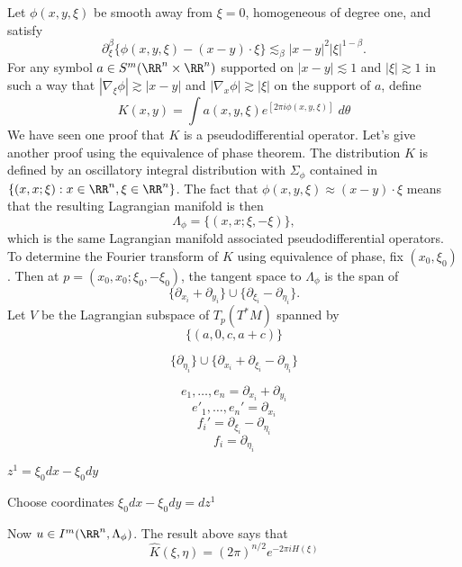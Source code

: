 \begin{example}
    Let $\phi(x,y,\xi)$ be smooth away from $\xi = 0$, homogeneous of degree one, and satisfy
    \[ \partial^\beta_\xi \{ \phi (x,y,\xi) - (x - y) \cdot \xi \} \lesssim_\beta |x - y|^2 |\xi|^{1-\beta}. \]
    For any symbol $a \in S^m(\RR^n \times \RR^n)$ supported on $|x - y| \lesssim 1$ and $|\xi| \gtrsim 1$ in such a way that $|\nabla_\xi \phi| \gtrsim |x - y|$ and $|\nabla_x \phi | \gtrsim |\xi|$ on the support of $a$, define
    \[ K(x,y) = \int a(x,y,\xi) e^[2 \pi i \phi(x,y,\xi)]\; d\theta \]
    We have seen one proof that $K$ is a pseudodifferential operator. Let's give another proof using the equivalence of phase theorem. The distribution $K$ is defined by an oscillatory integral distribution with $\Sigma_\phi$ contained in $\{ (x,x;\xi) : x \in \RR^n, \xi \in \RR^n \}$. The fact that $\phi(x,y,\xi) \approx (x - y) \cdot \xi$ means that the resulting Lagrangian manifold is then
    \[ \Lambda_\phi = \{ (x,x; \xi, - \xi ) \}, \]
    which is the same Lagrangian manifold associated pseudodifferential operators. To determine the Fourier transform of $K$ using equivalence of phase, fix $(x_0,\xi_0)$. Then at $p = (x_0,x_0;\xi_0,-\xi_0)$, the tangent space to $\Lambda_\phi$ is the span of
    \[ \{ \partial_{x_i} + \partial_{y_i} \} \cup \{ \partial_{\xi_i} - \partial_{\eta_i} \}. \]
    Let $V$ be the Lagrangian subspace of $T_p(T^* M)$ spanned by
    \[ \{ (a,0,c,a + c) \} \]

    \[ \{ \partial_{\eta_i} \} \cup \{ \partial_{x_i} + \partial_{\xi_i} - \partial_{\eta_i} \} \]

    \[ e_1,\dots,e_n = \partial_{x_i} + \partial_{y_i} \]
    \[ e'_1,\dots,e_n' = \partial_{x_i} \]
    \[ f_i' = \partial_{\xi_i} - \partial_{\eta_i} \]
    \[ f_i = \partial_{\eta_i} \]


    $z^1 = \xi_0 dx - \xi_0 dy$

    Choose coordinates $\xi_0 dx - \xi_0 dy = dz^1$


    Now $u \in I^m(\RR^n, \Lambda_\phi)$. The result above says that
    \[ \widehat{K}(\xi,\eta) = (2 \pi)^{n/2} e^{-2 \pi i H(\xi)} \]
\end{example}

















